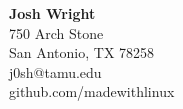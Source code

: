 \documentclass[12pt]{article}
\begin{document}
\noindent
{}
\sffamily

\begin{center}
{\large \textbf{Josh Wright}\\}
750 Arch Stone\\
San Antonio, TX 78258\\
j0sh@tamu.edu\\
github.com/madewithlinux\\
\end{center}

\end{document}
